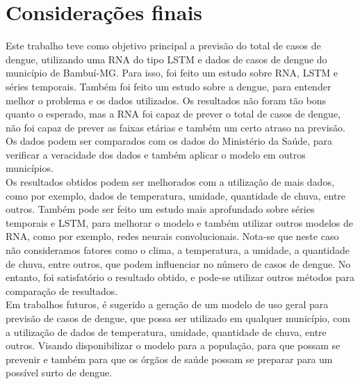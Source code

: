 \documentclass[
	article,			%
	11pt,				%
	a4paper,			%
	chapter=TITLE,		%
	section=TITLE,		%
	subsection=TITLE,	%
	subsubsection=TITLE %
	english,			%
	brazil,				%
	sumario=tradicional
	]{abntex2}
\begin{document}
 
\section{Considerações finais}
Este trabalho teve como objetivo principal a previsão do total de casos de dengue, utilizando uma RNA do tipo LSTM e dados de casos de dengue do município de Bambuí-MG. Para isso, foi feito um estudo sobre RNA, LSTM e séries temporais. Também foi feito um estudo sobre a dengue, para entender melhor o problema e os dados utilizados. Os resultados não foram tão bons quanto o esperado, mas a RNA foi capaz de prever o total de casos de dengue, não foi capaz de prever as faixas etárias e também um certo atraso na previsão. Os dados podem ser comparados com os dados do Ministério da Saúde, para verificar a veracidade dos dados e também aplicar o modelo em outros municípios. 
\\ \indent
Os resultados obtidos podem ser melhorados com a utilização de mais dados, como por exemplo, dados de temperatura, umidade, quantidade de chuva, entre outros. Também pode ser feito um estudo mais aprofundado sobre séries temporais e LSTM, para melhorar o modelo e também utilizar outros modelos de RNA, como por exemplo, redes neurais convolucionais. Nota-se que neste caso não consideramos fatores como o clima, a temperatura, a umidade, a quantidade de chuva, entre outros, que podem influenciar no número de casos de dengue. No entanto, foi satisfatório o resultado obtido, e pode-se utilizar outros métodos para comparação de resultados. 
\\ \indent
Em trabalhos futuros, é sugerido a geração de um modelo de uso geral para previsão de casos de dengue, que possa ser utilizado em qualquer município, com a utilização de dados de temperatura, umidade, quantidade de chuva, entre outros. Visando disponibilizar o modelo para a população, para que possam se prevenir e também para que os órgãos de saúde possam se preparar para um possível surto de dengue.

\begin{citacao}

\end{citacao}



\postextual


\end{document}
